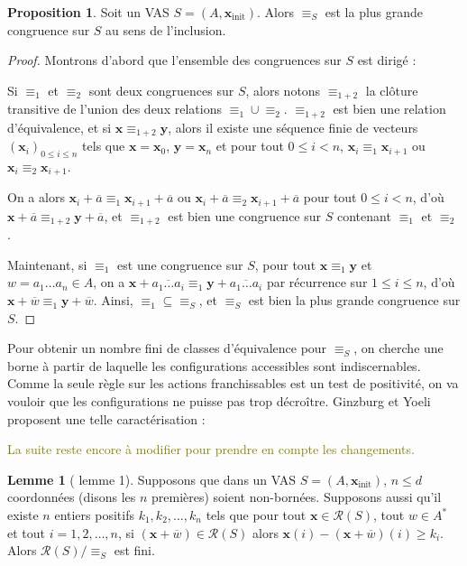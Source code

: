 \documentclass[a4paper,final]{article}
\theoremstyle{definition}
\newtheorem{Proposition}[Theorem]{Proposition}
\newtheorem{Lemma}[Theorem]{Lemme}
\let\leq\leqslant
\let\geq\geqslant
\newcommand{\lucas}[1]{\textcolor{olive}{#1}}
\let\union\cup
\newcommand{\conf}{\ensuremath{\mathcal{R}}}
\newcommand{\vect}[1]{\ensuremath{\mathbf{#1}}}
\newcommand{\rel}{\ensuremath{\equiv}}
\newcommand{\xinit}{\ensuremath{\vect{x}_\text{init}}}
\newcommand{\valeur}[1]{\ensuremath{\overline{#1}}}
\begin{document}
\begin{Proposition}
Soit un VAS $S=(A,\xinit)$.
Alors $\rel_S$ est la plus grande congruence sur $S$ au sens de l'inclusion.
\end{Proposition}

\begin{proof}
Montrons d'abord que l'ensemble des congruences sur $S$ est dirigé :

Si $\rel_1$ et $\rel_2$ sont deux congruences sur $S$, alors notons $\rel_{1+2}$ la clôture transitive de l'union des deux relations $\rel_1\union\rel_2$.
$\rel_{1+2}$ est bien une relation d'équivalence, 
et si $\vect{x}\rel_{1+2}\vect{y}$, alors il existe une séquence finie de vecteurs ${(\vect{x}_i)}_{0\leq i\leq n}$ tels que 
$\vect{x}=\vect{x}_0$, $\vect{y}=\vect{x}_n$ et pour tout $0\leq i<n$, $\vect{x}_i\rel_1\vect{x}_{i+1}$ ou $\vect{x}_i\rel_2\vect{x}_{i+1}$.

On a alors $\vect{x}_i +\valeur{a} \rel_1 \vect{x}_{i+1} +\valeur{a}$ ou $\vect{x}_i +\valeur{a} \rel_2 \vect{x}_{i+1} +\valeur{a}$ pour tout $0\leq i<n$, 
d'où $\vect{x} +\valeur{a} \rel_{1+2} \vect{y} +\valeur{a}$, 
et $\rel_{1+2}$ est bien une congruence sur $S$ contenant $\rel_1$ et $\rel_2$.

Maintenant, si $\rel_1$ est une congruence sur $S$, pour tout $\vect{x}\rel_1\vect{y}$ et $w=a_1\dots a_n\in A$, on a 
$\vect{x} +\valeur{a_1\dots a_i} \rel_1\vect{y} +\valeur{a_1\dots a_i}$ par récurrence sur $1\leq i\leq n$, d'où $\vect{x} +\valeur{w} \rel_1\vect{y} +\valeur{w}$.
Ainsi, $\rel_1\subseteq \rel_S$, et $\rel_S$ est bien la plus grande congruence sur $S$.
\end{proof}

\color{black} %

Pour obtenir un nombre fini de classes d'équivalence pour $\rel_S$, on cherche une borne à partir de laquelle les configurations accessibles sont indiscernables.
Comme la seule règle sur les actions franchissables est un test de positivité, on va vouloir que les configurations ne puisse pas trop décroître.
Ginzburg et Yoeli proposent une telle caractérisation :

\lucas{La suite reste encore à modifier pour prendre en compte les changements.}

\begin{Lemma}[\cite{giyo80} lemme 1]
    Supposons que dans un VAS $S=(A,\xinit)$, $n\leq d$ coordonnées (disons les $n$ premières) soient non-bornées.
    Supposons aussi qu'il existe $n$ entiers positifs $k_1,k_2,\dots,k_n$ tels que pour tout $\vect{x}\in\conf(S)$, tout $w\in A^\ast$ et tout $i=1,2,\dots,n$, 
    si $(\vect{x} +\valeur{w})\in\conf(S)$ alors $\vect{x}(i) - (\vect{x} +\valeur{w})(i)\geq k_i$.
    Alors $\conf(S)/\rel_S$ est fini.
\end{Lemma}
\end{document}
